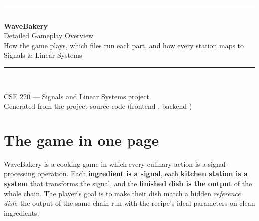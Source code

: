 \documentclass[11pt,a4paper]{article}
\begin{document}
\begin{titlepage}
\centering
\vspace*{2.5cm}
{\color{wkorange}\rule{\linewidth}{1.2pt}}\\[0.6cm]
{\Huge\bfseries\color{wkink} WaveBakery}\\[0.35cm]
{\LARGE\color{wkteal} Detailed Gameplay Overview}\\[0.3cm]
{\large How the game plays, which files run each part, and how every station maps to Signals \& Linear Systems}\\[0.6cm]
{\color{wkorange}\rule{\linewidth}{1.2pt}}\\[1.6cm]


\vfill
{\large CSE 220 --- Signals and Linear Systems project}\\[0.2cm]
{\color{wkgrey} Generated from the project source code (frontend , backend )}
\end{titlepage}

\tableofcontents
\newpage

\section{The game in one page}
WaveBakery is a cooking game in
which every culinary action is a signal-processing operation. Each
\textbf{ingredient is a signal}, each \textbf{kitchen station is a system}
that transforms the signal, and the \textbf{finished dish is the output} of the
whole chain. The player's goal is to make their dish match a hidden
\emph{reference dish}: the output of the same chain run with the recipe's ideal
parameters on clean ingredients.
\end{document}
